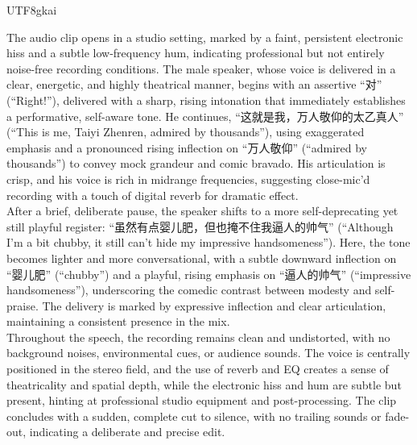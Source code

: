 \begin{CJK*}{UTF8}{gkai}

\begin{tcolorbox}[
    colback=lightgray,
    colframe=black,
    boxrule=2pt,
    sharp corners,
    width=\textwidth,
    title={Analysis of Expressive Speech},
    colbacktitle=black,
    coltitle=white,
    fonttitle=\bfseries\sffamily,
    halign title=center,
]
\ttfamily
The audio clip opens in a studio setting, marked by a faint, persistent electronic hiss and a subtle low-frequency hum, indicating professional but not entirely noise-free recording conditions. The male speaker, whose voice is delivered in a clear, energetic, and highly theatrical manner, begins with an assertive “对” (“Right!”), delivered with a sharp, rising intonation that immediately establishes a performative, self-aware tone. He continues, “这就是我，万人敬仰的太乙真人” (“This is me, Taiyi Zhenren, admired by thousands”), using exaggerated emphasis and a pronounced rising inflection on “万人敬仰” (“admired by thousands”) to convey mock grandeur and comic bravado. His articulation is crisp, and his voice is rich in midrange frequencies, suggesting close-mic’d recording with a touch of digital reverb for dramatic effect.\\

After a brief, deliberate pause, the speaker shifts to a more self-deprecating yet still playful register: “虽然有点婴儿肥，但也掩不住我逼人的帅气” (“Although I’m a bit chubby, it still can’t hide my impressive handsomeness”). Here, the tone becomes lighter and more conversational, with a subtle downward inflection on “婴儿肥” (“chubby”) and a playful, rising emphasis on “逼人的帅气” (“impressive handsomeness”), underscoring the comedic contrast between modesty and self-praise. The delivery is marked by expressive inflection and clear articulation, maintaining a consistent presence in the mix.\\

Throughout the speech, the recording remains clean and undistorted, with no background noises, environmental cues, or audience sounds. The voice is centrally positioned in the stereo field, and the use of reverb and EQ creates a sense of theatricality and spatial depth, while the electronic hiss and hum are subtle but present, hinting at professional studio equipment and post-processing. The clip concludes with a sudden, complete cut to silence, with no trailing sounds or fade-out, indicating a deliberate and precise edit.\\


\end{tcolorbox}
\end{CJK*}
